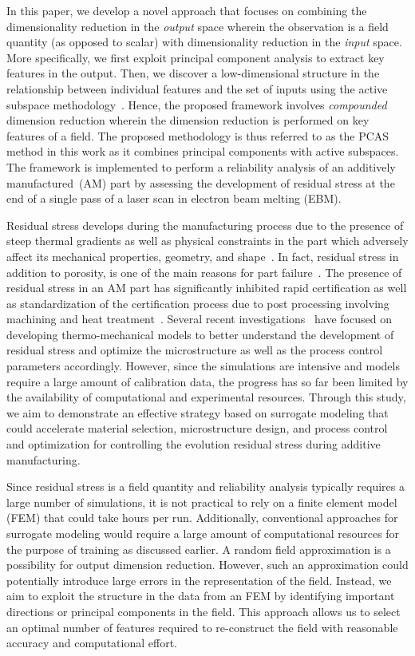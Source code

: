 In this paper, we develop a novel approach that focuses on combining the dimensionality reduction in the \textit{output}
space wherein the observation is a field quantity (as opposed to scalar) with dimensionality reduction in the \textit{input} 
space. More specifically, we first exploit principal component analysis to extract key features in the output. Then, we 
discover a 
low-dimensional structure in the relationship between individual features and the set of inputs using the active
subspace methodology~\cite{Constantine:2015}. Hence, the proposed framework involves \textit{compounded} dimension
reduction wherein the dimension reduction is performed on key features of a field. The proposed methodology is
thus referred to as the PCAS method in this work as it combines principal components with active subspaces.
The framework is implemented to
perform a reliability analysis of an additively manufactured~(AM) part by assessing the development of residual stress
at the end of a single pass of a laser scan in electron beam melting (EBM). 

Residual stress develops during the manufacturing process due to the presence of steep thermal gradients as
well as physical constraints in the part which adversely affect its mechanical properties, geometry, and 
shape~\cite{Withers:2001,Mercelis:2006,Hofmann:2014}. 
In fact, residual stress in addition to porosity, is one of the main reasons for 
part failure~\cite{Kim:2018}. The presence of residual stress in an AM part has significantly 
inhibited rapid certification as well as standardization of the certification process
due to post processing involving machining and heat treatment~\cite{Shiomi:2004}.
Several recent investigations~\cite{Vastola:2016,Hodge:2016,Williams:2018}
have focused on developing thermo-mechanical
models to better understand the development of residual stress and optimize the microstructure as well as
the process control parameters accordingly. However, since the simulations are intensive and models require a 
large amount of calibration data, the progress has so far been limited by the availability
of computational and experimental resources. Through this study, we aim to demonstrate an effective strategy
based on surrogate modeling that could accelerate material selection, microstructure design, and
process control and optimization for controlling the evolution residual stress during additive manufacturing. 

Since residual
stress is a field quantity and reliability analysis typically requires a large number of simulations, it is not practical
to rely on a finite element model (FEM) that could take hours per run. Additionally, conventional approaches for surrogate
modeling would require a large amount of computational resources for the purpose of training as discussed earlier.
 A random field approximation is a possibility for
output dimension reduction. However, such an approximation could potentially introduce large errors in the  
representation of the field. Instead, we aim to exploit the structure in the data from an FEM by identifying important 
directions or principal components in the field. This approach allows us to select an optimal number of 
features required to re-construct the field with reasonable accuracy and computational effort. 


